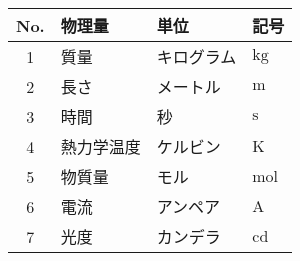 \begin{tabular}{clll}
 No. & 物理量 & 単位 & 記号 \\
 \hline
 1 & 質量 & キログラム & $\mathrm{kg}$ \\
 2 & 長さ & メートル & $\mathrm{m}$ \\
 3 & 時間 & 秒 & $\mathrm{s}$ \\
 4 & 熱力学温度 & ケルビン & $\mathrm{K}$ \\
 5 & 物質量 & モル & $\mathrm{mol}$ \\
 6 & 電流 & アンペア & $\mathrm{A}$ \\
 7 & 光度 & カンデラ & $\mathrm{cd}$ \\
 \hline
\end{tabular}
